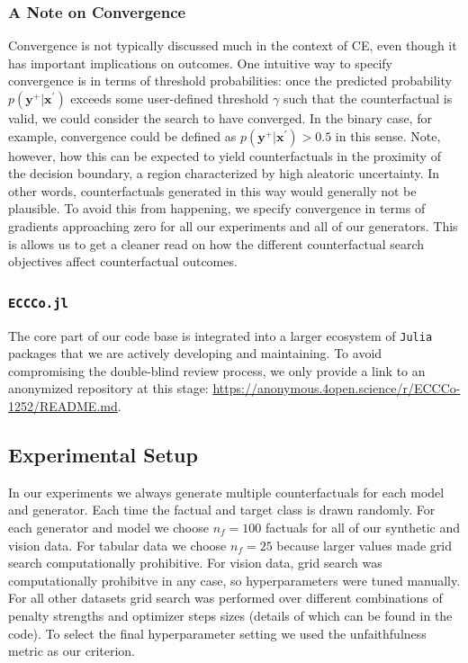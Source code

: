 \subsubsection{A Note on Convergence}\label{convergence}

Convergence is not typically discussed much in the context of CE, even though it has important implications on outcomes. One intuitive way to specify convergence is in terms of threshold probabilities: once the predicted probability $p(\mathbf{y}^+|\mathbf{x}^{\prime})$ exceeds some user-defined threshold $\gamma$ such that the counterfactual is valid, we could consider the search to have converged. In the binary case, for example, convergence could be defined as $p(\mathbf{y}^+|\mathbf{x}^{\prime})>0.5$ in this sense. Note, however, how this can be expected to yield counterfactuals in the proximity of the decision boundary, a region characterized by high aleatoric uncertainty. In other words, counterfactuals generated in this way would generally not be plausible. To avoid this from happening, we specify convergence in terms of gradients approaching zero for all our experiments and all of our generators. This is allows us to get a cleaner read on how the different counterfactual search objectives affect counterfactual outcomes. 

\subsubsection{\texttt{ECCCo.jl}}

The core part of our code base is integrated into a larger ecosystem of \texttt{Julia} packages that we are actively developing and maintaining. To avoid compromising the double-blind review process, we only provide a link to an anonymized repository at this stage: \url{https://anonymous.4open.science/r/ECCCo-1252/README.md}. 

\subsection{Experimental Setup}\label{app:setup}

In our experiments we always generate multiple counterfactuals for each model and generator. Each time the factual and target class is drawn randomly. For each generator and model we choose $n_f=100$ factuals for all of our synthetic and vision data. For tabular data we choose $n_f=25$ because larger values made grid search computationally prohibitive. For vision data, grid search was computationally prohibitve in any case, so hyperparameters were tuned manually. For all other datasets grid search was performed over different combinations of penalty strengths and optimizer steps sizes (details of which can be found in the code). To select the final hyperparameter setting we used the unfaithfulness metric as our criterion.

